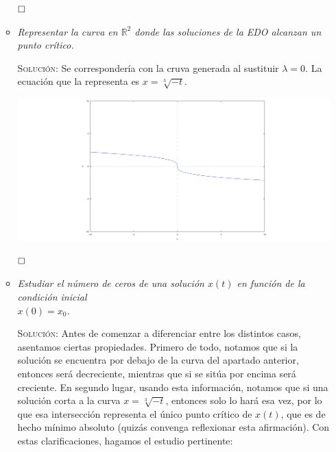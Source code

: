 \documentclass{article}
\begin{document}
\begin{enumerate}
\begin{itemize}
        $\hfill\square$

        \vspace{7px}

        \item \textit{Representar la curva en $\mathbb{R}^2$ donde las soluciones de la EDO alcanzan un punto crítico.}

        \vspace{7px}

        \textsc{Solución:} Se correspondería con la cruva generada al sustituir $\lambda = 0$. La ecuación que la representa es $x = \sqrt[3]{-t}$.

        \includegraphics[width=\textwidth]{critico.png}

        $\hfill\square$

        \newpage

        \vspace{7px}

        \item \textit{Estudiar el número de ceros de una solución $x(t)$ en función de la condición inicial \\ $x(0) = x_0$.}

        \vspace{7px}

        \textsc{Solución:} Antes de comenzar a diferenciar entre los distintos casos, asentamos ciertas propiedades. Primero de todo, notamos que si la solución se encuentra por debajo de la curva del apartado anterior, entonces será decreciente, mientras que si se sitúa por encima será creciente. En segundo lugar, usando esta información, notamos que si una solución corta a la curva $x = \sqrt[3]{-t}$, entonces solo lo hará esa vez, por lo que esa intersección representa el único punto crítico de $x(t)$, que es de hecho mínimo absoluto (quizás convenga reflexionar esta afirmación). Con estas clarificaciones, hagamos el estudio pertinente:


\end{itemize}
\end{enumerate}
\end{document}
